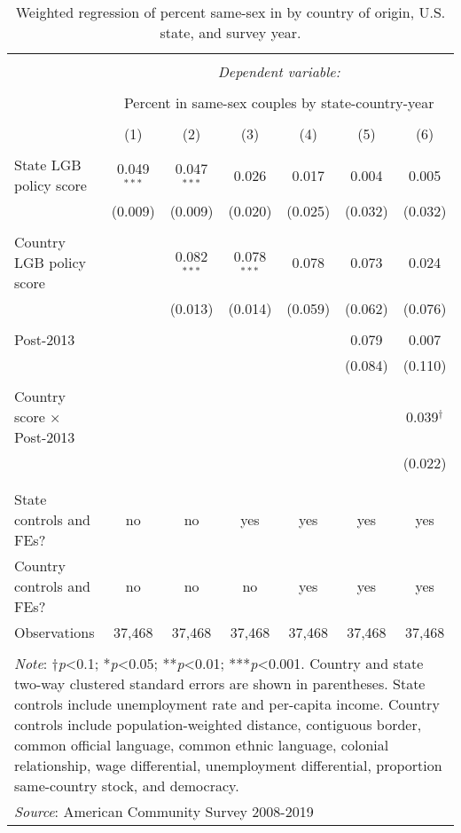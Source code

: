 \documentclass[
  11pt,
]{article}
\begin{document}
\begin{table}[H] \centering 
  \caption{Weighted regression of percent same-sex in by country of origin, U.S. state, and survey year. } 
  \label{tab:state-props} 
\begin{tabular}{@{\extracolsep{5pt}}lcccccc} 
\\[-1.8ex]\hline 
\hline \\[-1.8ex] 
 & \multicolumn{6}{c}{\textit{Dependent variable:}} \\ 
\cline{2-7} 
\\[-1.8ex] & \multicolumn{6}{c}{Percent in same-sex couples by state-country-year} \\ 
\\[-1.8ex] & (1) & (2) & (3) & (4) & (5) & (6)\\ 
\hline \\[-1.8ex] 
 State LGB policy score & 0.049$^{***}$ & 0.047$^{***}$ & 0.026 & 0.017 & 0.004 & 0.005 \\ 
  & (0.009) & (0.009) & (0.020) & (0.025) & (0.032) & (0.032) \\ 
  & & & & & & \\ 
 Country LGB policy score &  & 0.082$^{***}$ & 0.078$^{***}$ & 0.078 & 0.073 & 0.024 \\ 
  &  & (0.013) & (0.014) & (0.059) & (0.062) & (0.076) \\ 
  & & & & & & \\ 
 Post-2013 &  &  &  &  & 0.079 & 0.007 \\ 
  &  &  &  &  & (0.084) & (0.110) \\ 
  & & & & & & \\ 
 Country score × Post-2013 &  &  &  &  &  & 0.039$^{†}$ \\ 
  &  &  &  &  &  & (0.022) \\ 
  & & & & & & \\ 
\hline \\[-1.8ex] 
State controls and FEs? & no & no & yes & yes & yes & yes \\ 
Country controls and FEs? & no & no & no & yes & yes & yes \\ 
Observations & 37,468 & 37,468 & 37,468 & 37,468 & 37,468 & 37,468 \\ 
\hline 
\hline \\[-1.8ex] 
\multicolumn{7}{l}{\parbox[t]{.8\textwidth}{\textit{Note}: †\textit{p}<0.1; *\textit{p}<0.05; **\textit{p}<0.01; ***\textit{p}<0.001. Country and state two-way clustered standard errors are shown in parentheses. State controls include unemployment rate and per-capita income. Country controls include population-weighted distance, contiguous border, common official language, common ethnic language, colonial relationship, wage differential, unemployment differential, proportion same-country stock, and democracy.}} \\ 
\multicolumn{7}{l}{\textit{Source}: American Community Survey 2008-2019} \\ 
\end{tabular} 
\end{table}
\end{document}
